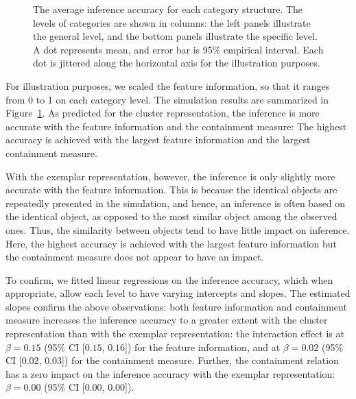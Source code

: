 \documentclass[doc]{apa6}
\begin{document}
\begin{figure}[t!]
    \centering



    \caption{The average inference accuracy for each category structure. The levels of categories
    are shown in columns: the left panels illustrate the general level, and the bottom panels
    illustrate the specific level.  A dot represents mean, and error bar is 95\% empirical interval.
    Each dot is jittered along the horizontal axis for the illustration purposes.}

\label{fig:result}
\end{figure}

For illustration purposes, we scaled the feature information, so that it ranges from 0 to 1 on each
category level. The simulation results are summarized in Figure~\ref{fig:result}. As predicted for
the cluster representation, the inference is more accurate with the feature information and the
containment measure: The highest accuracy is achieved with the largest feature information and the
largest containment measure.

With the exemplar representation, however, the inference is only slightly more accurate with the
feature information. This is because the identical objects are repeatedly presented in the
simulation, and hence, an inference is often based on the identical object, as opposed to the most
similar object among the observed ones. Thus, the similarity between objects tend to have little
impact on inference.  Here, the highest accuracy is achieved with the largest feature information
but the containment measure does not appear to have an impact.

To confirm, we fitted linear regressions on the inference accuracy, which when appropriate, allow
each level to have varying intercepts and slopes. The estimated slopes confirm the above
observations: both feature information and containment measure increases the inference accuracy to a
greater extent with the cluster representation than with the exemplar representation: the
interaction effect is at $\beta=0.15$ (95\% CI [$0.15$, $0.16$]) for the feature information, and at
$\beta=0.02$ (95\% CI [$0.02$, $0.03$]) for the containment measure. Further, the containment
relation has a zero impact on the inference accuracy with the exemplar representation: $\beta=0.00$
(95\% CI [$0.00$, $0.00$]).
\end{document}
